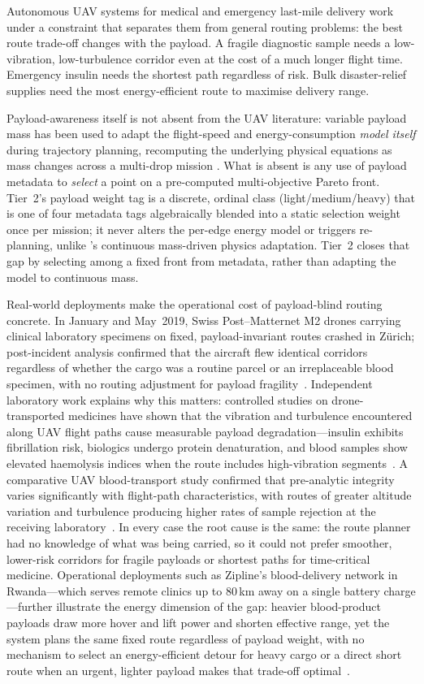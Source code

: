 \documentclass{ssnreview}
\begin{document}
Autonomous UAV systems for medical and emergency last-mile delivery work under a
constraint that separates them from general routing problems: the best route trade-off
changes with the payload. A fragile diagnostic sample needs a low-vibration,
low-turbulence corridor even at the cost of a much longer flight time. Emergency insulin
needs the shortest path regardless of risk. Bulk disaster-relief supplies need the most
energy-efficient route to maximise delivery range.

Payload-awareness itself is not absent from the UAV literature: variable payload mass has
been used to adapt the flight-speed and energy-consumption \emph{model itself} during
trajectory planning, recomputing the underlying physical equations as mass changes across
a multi-drop mission \cite{r10}. What is absent is any use of payload metadata to
\emph{select} a point on a pre-computed multi-objective Pareto front. Tier~2's payload
weight tag is a discrete, ordinal class (light/medium/heavy) that is one of four metadata
tags algebraically blended into a static selection weight once per mission; it never
alters the per-edge energy model or triggers re-planning, unlike \cite{r10}'s continuous
mass-driven physics adaptation. Tier~2 closes that gap by selecting among a fixed front
from metadata, rather than adapting the model to continuous mass.

Real-world deployments make the operational cost of payload-blind routing concrete.
In January and May~2019, Swiss Post--Matternet M2 drones carrying clinical laboratory
specimens on fixed, payload-invariant routes crashed in Z\"{u}rich; post-incident
analysis confirmed that the aircraft flew identical corridors regardless of whether the
cargo was a routine parcel or an irreplaceable blood specimen, with no routing
adjustment for payload fragility~\cite{r12}. Independent laboratory work explains why
this matters: controlled studies on drone-transported medicines have shown that the
vibration and turbulence encountered along UAV flight paths cause measurable payload
degradation---insulin exhibits fibrillation risk, biologics undergo protein denaturation,
and blood samples show elevated haemolysis indices when the route includes high-vibration
segments~\cite{r13,r14}. A comparative UAV blood-transport study confirmed that
pre-analytic integrity varies significantly with flight-path characteristics, with routes
of greater altitude variation and turbulence producing higher rates of sample rejection at
the receiving laboratory~\cite{r15}. In every case the root cause is the same: the route
planner had no knowledge of what was being carried, so it could not prefer smoother,
lower-risk corridors for fragile payloads or shortest paths for time-critical medicine.
Operational deployments such as Zipline's blood-delivery network in Rwanda---which serves
remote clinics up to 80\,km away on a single battery charge---further illustrate the
energy dimension of the gap: heavier blood-product payloads draw more hover and lift
power and shorten effective range, yet the system plans the same fixed route regardless
of payload weight, with no mechanism to select an energy-efficient detour for heavy cargo
or a direct short route when an urgent, lighter payload makes that trade-off
optimal~\cite{r16}.
\end{document}
